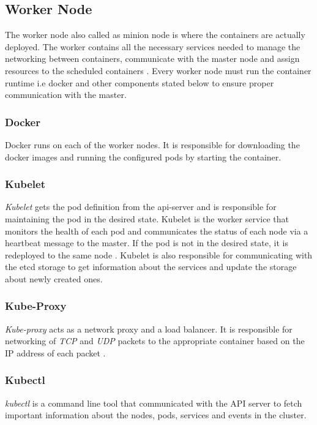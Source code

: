 \documentclass[9pt,twocolumn,twoside]{../../styles/osajnl}
\begin{document}
\subsection{Worker Node}
The worker node also called as minion node is where the containers are
actually deployed. The worker contains all the necessary services
needed to manage the networking between containers, communicate with
the master node and assign resources to the scheduled containers
\cite{www-kubernetes-architecture}. Every worker node must run the
container runtime i.e docker and other components stated below to
ensure proper communication with the master.

\subsubsection{Docker}
Docker runs on each of the worker nodes. It is responsible for
downloading the docker images and running the configured pods by
starting the container.

\subsubsection{Kubelet}
\emph{Kubelet} gets the pod definition from the api-server and is
responsible for maintaining the pod in the desired state. Kubelet is
the worker service that monitors the health of each pod and
communicates the status of each node via a heartbeat message to the
master. If the pod is not in the desired state, it is redeployed to
the same node \cite{www-wiki-kubernetes}. Kubelet is also responsible
for communicating with the etcd storage to get information about the
services and update the storage about newly created ones.

\subsubsection{Kube-Proxy}
\emph{Kube-proxy} acts as a network proxy and a load balancer. It is
responsible for networking of \emph{TCP} and \emph{UDP} packets to the
appropriate container based on the IP address of each packet
\cite{www-wiki-kubernetes} \cite{www-kubernetes-architecture}.

\subsubsection{Kubectl}
\emph{kubectl} is a command line tool that communicated with the API
server to fetch important information about the nodes, pods, services
and events in the cluster.
\end{document}
